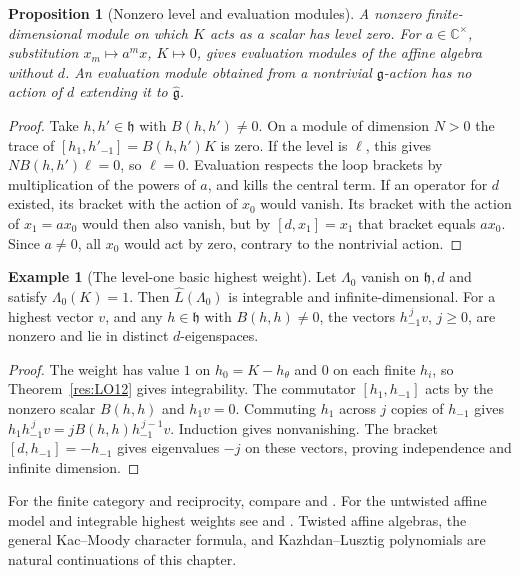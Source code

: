 \documentclass[11pt,oneside,openany]{book}
\newtheorem{proposition}[theorem]{Proposition}
\theoremstyle{definition}
\newtheorem{example}[theorem]{Example}
\theoremstyle{remark}
\begin{document}
\begin{proposition}[Nonzero level and evaluation modules]
\label{res:LO13}
A nonzero finite-dimensional module on which \(K\) acts as a scalar
has level zero. For \(a\in\mathbb C^\times\), substitution
\(x_m\mapsto a^m x\), \(K\mapsto0\), gives evaluation modules
of the affine algebra without \(d\). An evaluation module
obtained from a nontrivial \(\mathfrak g\)-action has no action
of \(d\) extending it to \(\widehat{\mathfrak g}\).
\end{proposition}
\begin{proof}
Take \(h,h'\in\mathfrak h\) with \(B(h,h')\ne0\).
On a module of dimension \(N>0\) the trace of
\([h_1,h'_{-1}]=B(h,h')K\) is zero. If the level is
\(\ell\), this gives \(N B(h,h')\ell=0\), so \(\ell=0\).
Evaluation respects the loop brackets by multiplication
of the powers of \(a\), and kills the central term.
If an operator for \(d\) existed, its bracket with
the action of \(x_0\) would vanish. Its bracket with
the action of \(x_1=a x_0\) would then also vanish,
but by \([d,x_1]=x_1\) that bracket equals \(a x_0\).
Since \(a\ne0\), all \(x_0\) would act by zero,
contrary to the nontrivial action.
\end{proof}

\begin{example}[The level-one basic highest weight]
\label{res:LO14}
Let \(\Lambda_0\) vanish on \(\mathfrak h,d\) and satisfy
\(\Lambda_0(K)=1\). Then \(\widehat L(\Lambda_0)\) is
integrable and infinite-dimensional. For a highest vector \(v\),
and any \(h\in\mathfrak h\) with \(B(h,h)\ne0\),
the vectors \(h_{-1}^{\,j}v\), \(j\ge0\), are nonzero
and lie in distinct \(d\)-eigenspaces.
\end{example}
\begin{proof}
The weight has value \(1\) on \(h_0=K-h_\theta\)
and \(0\) on each finite \(h_i\), so
Theorem~\ref{res:LO12} gives integrability.
The commutator \([h_1,h_{-1}]\) acts by the nonzero
scalar \(B(h,h)\) and \(h_1v=0\).
Commuting \(h_1\) across \(j\) copies of \(h_{-1}\) gives
\(h_1h_{-1}^{\,j}v=jB(h,h)h_{-1}^{\,j-1}v\).
Induction gives nonvanishing. The bracket
\([d,h_{-1}]=-h_{-1}\) gives eigenvalues \(-j\) on these
vectors, proving independence and infinite dimension.
\end{proof}

For the finite category and reciprocity, compare
\cite[Sections 15.1, 16.3 and 20.1--20.4]{etingof-lie} and
\cite[Chapters 1 and 3]{humphreys-o}. For the untwisted affine
model and integrable highest weights see
\cite[Sections 3, 4.1--4.7]{hernandez-affine} and
\cite[Chapters 6--7, 9 and 12]{kac}. Twisted affine algebras,
the general Kac--Moody character formula, and Kazhdan--Lusztig
polynomials are natural continuations of this chapter.
\end{document}
